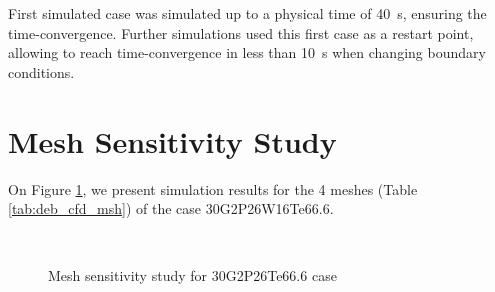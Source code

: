 \begin{note*}{}
First simulated case was simulated up to a physical time of 40\ s, ensuring the time-convergence. Further simulations used this first case as a restart point, allowing to reach time-convergence in less than 10\ s when changing boundary conditions.  
\end{note*}



\section{Mesh Sensitivity Study}

On Figure \ref{fig:deb_cfd_msh_sensi}, we present simulation results for the 4 meshes (Table \ref{tab:deb_cfd_msh}) of the case 30G2P26W16Te66.6. 

\begin{figure}[!h]
\centering
{}
\\
\caption{Mesh sensitivity study for 30G2P26Te66.6 case}
\label{fig:deb_cfd_msh_sensi}
\end{figure}


